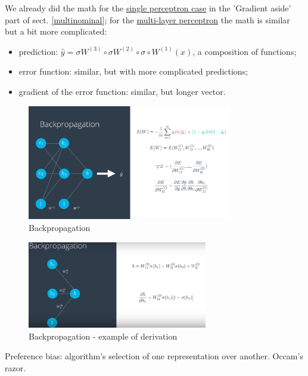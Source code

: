 \documentclass[11pt]{article}
\begin{document}
We already did the math for the \underline{single perceptron case} in the 'Gradient aside' part of sect. \ref{multinominal}; for the \underline{multi-layer perceptron} the math is similar but a bit more complicated:
\begin{itemize}
	\item prediction: $\hat{y} = \sigma W^{(3)} \circ \sigma W^{(2)} \circ \sigma \circ W^{(1)}(x)$, a composition of functions;
	\item error function: similar, but with more complicated predictions;
	\item gradient of the error function:  similar, but longer vector.
\end{itemize}
\begin{figure}[htbp] 
	\centering
	\includegraphics[width=0.8\textwidth]{pics/backpropagation1}
	\caption{Backpropagation} 
	\label{backpropagation1}
\end{figure}
\begin{figure}[htbp] 
	\centering
	\includegraphics[width=0.7\textwidth]{pics/backpropagation2}
	\caption{Backpropagation - example of derivation} 
	\label{backpropagation2}
\end{figure}

Preference bias: algorithm's selection of one representation over another. Occam's razor.
\end{document}
